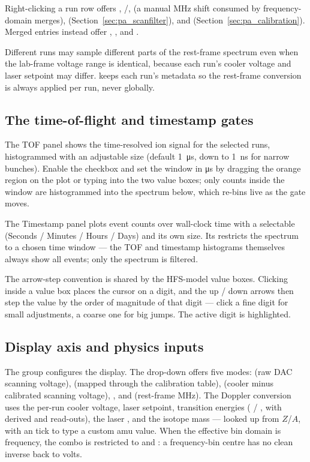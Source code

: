 Right-clicking a run row offers , /,
 (a manual MHz shift consumed by
frequency-domain merges), 
(Section~\ref{sec:pa_scanfilter}),  and
(Section~\ref{sec:pa_calibration}). Merged entries instead offer
, , and .

Different runs may sample different parts of the rest-frame spectrum
even when the lab-frame voltage range is identical, because each
run's cooler voltage and laser setpoint may differ. \denis{} keeps
each run's metadata so the rest-frame conversion is always applied
per run, never globally.

\subsection{The time-of-flight and timestamp gates}

The TOF panel shows the time-resolved ion signal for the selected
runs, histogrammed with an adjustable  size (default
1~\si{\micro\second}, down to 1~ns for narrow bunches). Enable the
 checkbox and set the window in \si{\micro\second} by
dragging the orange region on the plot or typing into the two value
boxes; only counts inside the window are histogrammed into the
spectrum below, which re-bins live as the gate moves.

The Timestamp panel plots event counts over wall-clock time with a
selectable  (Seconds / Minutes / Hours / Days) and its own
 size. Its  restricts the spectrum to a chosen
time window --- the TOF and timestamp histograms themselves always
show all events; only the spectrum is filtered.

The arrow-step convention is shared by the HFS-model value boxes.
Clicking inside a value box places the cursor on a digit, and the
up / down arrows then step the value by the order of magnitude of
that digit --- click a fine digit for small adjustments, a coarse one
for big jumps. The active digit is highlighted.

\subsection{Display axis and physics inputs}

The  group configures the display. The 
drop-down offers five modes:  (raw DAC scanning
voltage),  (mapped through the calibration
table),  (cooler minus calibrated
scanning voltage), , and  (rest-frame
MHz). The Doppler conversion uses the per-run cooler voltage, laser
setpoint, transition energies ( / , with
derived  and  read-outs), the laser
, and the isotope mass --- looked up from $Z$/$A$, with
an  tick to type a custom amu value. When the
effective bin domain is frequency, the combo is restricted to
 and : a frequency-bin centre has no
clean inverse back to volts.

